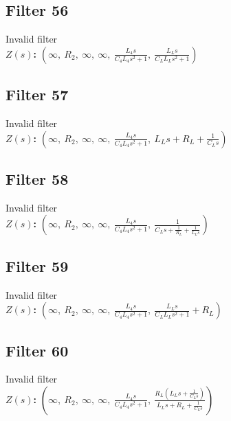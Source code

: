\documentclass{article}
\begin{document}
\subsection*{Filter 56}
Invalid filter \\ 
\textbf{$Z(s)$:} $\left( \infty, \  R_{2}, \  \infty, \  \infty, \  \frac{L_{4} s}{C_{4} L_{4} s^{2} + 1}, \  \frac{L_{L} s}{C_{L} L_{L} s^{2} + 1}\right)$ \\ 
\subsection*{Filter 57}
Invalid filter \\ 
\textbf{$Z(s)$:} $\left( \infty, \  R_{2}, \  \infty, \  \infty, \  \frac{L_{4} s}{C_{4} L_{4} s^{2} + 1}, \  L_{L} s + R_{L} + \frac{1}{C_{L} s}\right)$ \\ 
\subsection*{Filter 58}
Invalid filter \\ 
\textbf{$Z(s)$:} $\left( \infty, \  R_{2}, \  \infty, \  \infty, \  \frac{L_{4} s}{C_{4} L_{4} s^{2} + 1}, \  \frac{1}{C_{L} s + \frac{1}{R_{L}} + \frac{1}{L_{L} s}}\right)$ \\ 
\subsection*{Filter 59}
Invalid filter \\ 
\textbf{$Z(s)$:} $\left( \infty, \  R_{2}, \  \infty, \  \infty, \  \frac{L_{4} s}{C_{4} L_{4} s^{2} + 1}, \  \frac{L_{L} s}{C_{L} L_{L} s^{2} + 1} + R_{L}\right)$ \\ 
\subsection*{Filter 60}
Invalid filter \\ 
\textbf{$Z(s)$:} $\left( \infty, \  R_{2}, \  \infty, \  \infty, \  \frac{L_{4} s}{C_{4} L_{4} s^{2} + 1}, \  \frac{R_{L} \left(L_{L} s + \frac{1}{C_{L} s}\right)}{L_{L} s + R_{L} + \frac{1}{C_{L} s}}\right)$ \\ 
\end{document}
